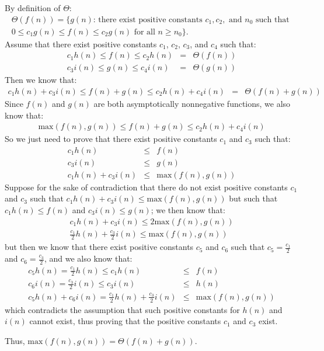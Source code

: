 By definition of $\Theta$:
\begin{eqnarray*}
	\Theta(f(n)) = \{g(n) \text{: there exist positive constants } c_1, c_2, \text{ and } n_0 \text{ such that } \\
	0 \leq c_1 g(n) \leq f(n) \leq c_2 g(n) \text{ for all } n \geq n_0\}.
\end{eqnarray*}
Assume that there exist positive constants $c_1$, $c_2$, $c_3$, and $c_4$ such that:
\begin{eqnarray*}
	c_1 h(n) \leq f(n) \leq c_2 h(n) & = & \Theta(f(n)) \\
	c_3 i(n) \leq g(n) \leq c_4 i(n) & = & \Theta(g(n))
\end{eqnarray*}
Then we know that:
\begin{eqnarray*}
	c_1 h(n) + c_3 i(n) \leq f(n) + g(n) \leq c_2 h(n) + c_4 i(n) & = & \Theta(f(n) + g(n))
\end{eqnarray*}
Since $f(n)$ and $g(n)$ are both asymptotically nonnegative functions, we also know that:
\begin{eqnarray*}
	\text{max}(f(n), g(n)) \leq f(n) + g(n) \leq c_2 h(n) + c_4 i(n)
\end{eqnarray*}
So we just need to prove that there exist positive constants $c_1$ and $c_3$ such that:
\begin{eqnarray*}
	c_1 h(n) & \leq & f(n) \\
	c_3 i(n) & \leq & g(n) \\
	c_1 h(n) + c_3 i(n) & \leq & \text{max}(f(n), g(n))
\end{eqnarray*}
Suppose for the sake of contradiction that there do not exist positive constants $c_1$ and $c_3$ such that $c_1 h(n) + c_3 i(n) \leq \text{max}(f(n), g(n))$ but such that $c_1 h(n) \leq f(n)$ and $c_3 i(n) \leq g(n)$; we then know that:
\begin{eqnarray*}
	c_1 h(n) + c_3 i(n) \leq 2 \text{max}(f(n), g(n)) \\
	\frac{c_1}{2} h(n) + \frac{c_3}{2} i(n) \leq \text{max}(f(n), g(n))
\end{eqnarray*}
but then we know that there exist positive constants $c_5$ and $c_6$ such that $c_5 = \frac{c_1}{2}$ and $c_6 = \frac{c_3}{2}$, and we also know that:
\begin{eqnarray*}
	c_5 h(n) = \frac{c_1}{2} h(n) \leq c_1 h(n) & \leq & f(n) \\
	c_6 i(n) = \frac{c_3}{2} i(n) \leq c_3 i(n) & \leq & h(n) \\
	c_5 h(n) + c_6 i(n) = \frac{c_1}{2} h(n) + \frac{c_3}{2} i(n) & \leq & \text{max}(f(n), g(n))
\end{eqnarray*}
which contradicts the assumption that such positive constants for $h(n)$ and $i(n)$ cannot exist, thus proving that the positive constants $c_1$ and $c_3$ exist.

Thus, $\text{max}(f(n), g(n)) = \Theta(f(n) + g(n))$.
